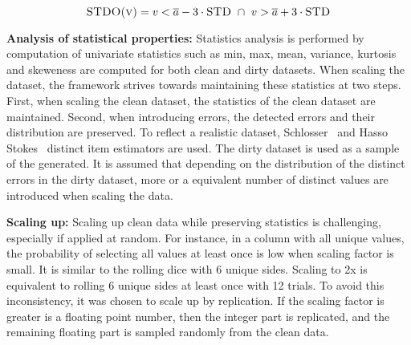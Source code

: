 \begin{equation}
\label{eq:is_outlier_std}
\textsc{STDO(v)} = v < \overline{a} - 3 \cdot \textsc{STD} \ \cap \ v > \overline{a} + 3 \cdot \textsc{STD} 
\end{equation}

\textbf{Analysis of statistical properties:} 
Statistics analysis is performed by computation of univariate statistics such as min, max, mean, variance, kurtosis and skeweness are computed for both clean and dirty datasets.
When scaling the dataset, the framework strives towards maintaining these statistics at two steps.
First, when scaling the clean dataset, the statistics of the clean dataset are maintained. 
Second, when introducing errors, the detected errors and their distribution are preserved.
To reflect a realistic dataset, Schlosser~\cite{HassNSS1995} and Hasso Stokes~\cite{HassS1998} distinct item estimators are used. 
The dirty dataset is used as a sample of the generated. It is assumed that depending on the distribution of the distinct errors in the dirty dataset, more or a equivalent number of distinct values are introduced when scaling the data.

\textbf{Scaling up:} 
Scaling up clean data while preserving statistics is challenging, especially if applied at random. 
For instance, in a column with all unique values, the probability of selecting all values at least once is low when scaling factor is small. 
It is similar to the rolling dice with 6 unique sides. 
Scaling to 2x is equivalent to rolling 6 unique sides at least once with 12 trials.
To avoid this inconsistency, it was chosen to scale up by replication. 
If the scaling factor is greater is a floating point number, then the integer part is replicated, and the remaining floating part is sampled randomly from the clean data.

